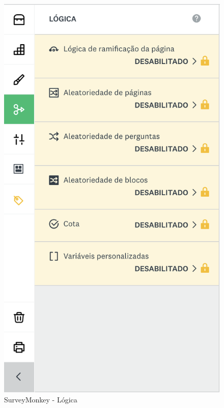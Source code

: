 \begin{figure}[ht!]
\begin{center}
		\hspace{1cm}
		\begin{minipage}{0.45\textwidth}
			\begin{center}
				\includegraphics[height=.35\textheight]{img/sm/surveymonkey-form-logica}
				\caption{SurveyMonkey - Lógica}
				\label{fig:surveymonkey-form-logica}
			\end{center}
		\end{minipage}
	\end{center}
\end{figure}

